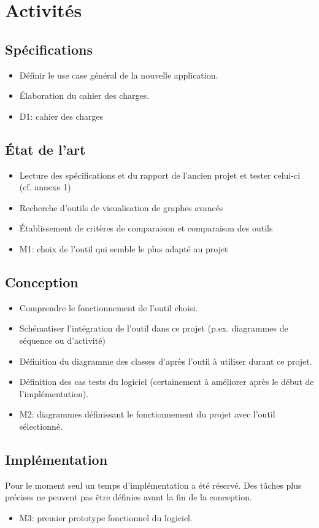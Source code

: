 \documentclass{article}
\begin{document}
\section{Activités}
  \subsection{Spécifications}
    \begin{itemize}
      \item Définir le use case général de la nouvelle application.
      \item Élaboration du cahier des charges.
      \item D1: cahier des charges
    \end{itemize}
  \subsection{État de l'art}
    \begin{itemize}
      \item Lecture des spécifications et du rapport de l'ancien projet et tester celui-ci (cf. annexe 1)
      \item Recherche d'outils de visualisation de graphes avancés
      \item Établissement de critères de comparaison et comparaison des outils
      \item M1: choix de l'outil qui semble le plus adapté au projet
    \end{itemize}
  \subsection{Conception}
    \begin{itemize}
      \item Comprendre le fonctionnement de l'outil choisi.
      \item Schématiser l'intégration de l'outil dans ce projet (p.ex. diagrammes de séquence ou d'activité)
      \item Définition du diagramme des classes d'après l'outil à utiliser durant ce projet.
      \item Définition des cas tests du logiciel (certainement à améliorer après le début de l'implémentation).
      \item M2: diagrammes définissant le fonctionnement du projet avec l'outil sélectionné.
    \end{itemize}
  \subsection{Implémentation}
  Pour le moment seul un temps d'implémentation a été réservé.
  Des tâches plus précises ne peuvent pas être définies avant la fin de la conception.
  \begin{itemize}
    \item M3: premier prototype fonctionnel du logiciel.
  \end{itemize}
\end{document}
